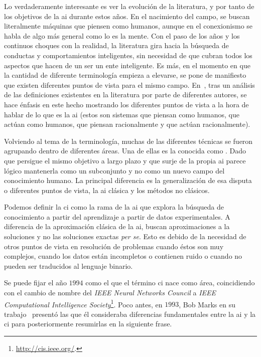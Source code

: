 Lo verdaderamente interesante es ver la evolución de la literatura, y por tanto de los objetivos de la \ac{ai} durante estos años. En el nacimiento del campo, se buscan literalmente máquinas que piensen como humanos, aunque en el conexionismo se habla de algo más general como lo es la mente. Con el paso de los años y los continuos choques con la realidad, la literatura gira hacia la búsqueda de conductas y comportamientos inteligentes, sin necesidad de que cubran todos los aspectos que hacen de un ser un ente inteligente. Es más, en el momento en que la cantidad de diferente terminología empieza a elevarse, se pone de manifiesto que existen diferentes puntos de vista para el mismo campo. En~\cite{russell2003artificial}, tras un análisis de las definiciones existentes en la literatura por parte de diferentes autores, se hace énfasis en este hecho mostrando los diferentes puntos de vista a la hora de hablar de lo que es la \ac{ai} (estos son sistemas que piensan como humanos, que actúan como humanos, que piensan racionalmente y que actúan racionalmente).

Volviendo al tema de la terminología, muchas de las diferentes técnicas se fueron agrupando dentro de diferentes áreas. Una de ellas es la conocida como . Dado que persigue el mismo objetivo a largo plazo y que surje de la propia \ac{ai} parece lógico mantenerla como un subconjunto y no como un nuevo campo del conocimiento humano. La principal diferencia es la generalización de esa disputa o diferentes puntos de vista, la \ac{ai} clásica y los métodos no clásicos.

Podemos definir la \ac{ci} como la rama de la \ac{ai} que explora la búsqueda de conocimiento a partir del aprendizaje a partir de datos experimentales. A diferencia de la aproximación clásica de la \ac{ai}, buscan aproximaciones a la soluciones y no las soluciones exactas \textit{per se}. Esto es debido de la necesidad de otros puntos de vista en resolución de problemas cuando éstos son muy complejos, cuando los datos están incompletos o contienen ruido o cuando no pueden ser traducidos al lenguaje binario.

Se puede fijar el año $1994$ como el que el término \ac{ci} nace como área, coincidiendo con el cambio de nombre del \textit{IEEE Neural Networks Council} a \textit{IEEE Computational Intelligence Society}\footnote{\url{http://cis.ieee.org/}.}. Poco antes, en $1993$, Bob Marks en su trabajo~\cite{bezdek1993intelligence} presentó las que él consideraba diferencias fundamentales entre la \ac{ai} y la \ac{ci} para posteriormente resumirlas en la siguiente frase.

